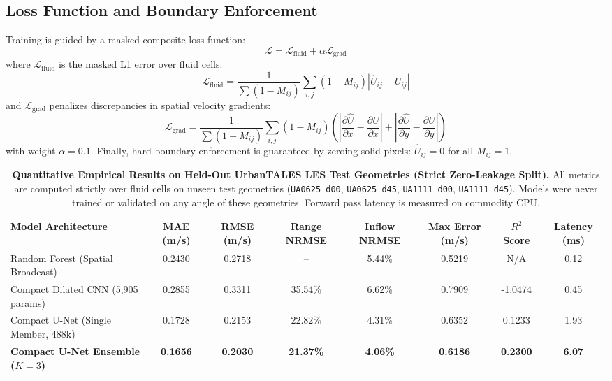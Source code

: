 \documentclass[10pt,twocolumn]{article}
\begin{document}
\subsection{Loss Function and Boundary Enforcement}
Training is guided by a masked composite loss function:
\begin{equation}
    \mathcal{L} = \mathcal{L}_{\text{fluid}} + \alpha \mathcal{L}_{\text{grad}}
\end{equation}
where $\mathcal{L}_{\text{fluid}}$ is the masked L1 error over fluid cells:
\begin{equation}
    \mathcal{L}_{\text{fluid}} = \frac{1}{\sum (1 - M_{ij})} \sum_{i,j} (1 - M_{ij}) |\widehat{U}_{ij} - U_{ij}|
\end{equation}
and $\mathcal{L}_{\text{grad}}$ penalizes discrepancies in spatial velocity gradients:
\begin{equation}
    \mathcal{L}_{\text{grad}} = \frac{1}{\sum (1 - M_{ij})} \sum_{i,j} (1 - M_{ij}) \left( \left|\frac{\partial \widehat{U}}{\partial x} - \frac{\partial U}{\partial x}\right| + \left|\frac{\partial \widehat{U}}{\partial y} - \frac{\partial U}{\partial y}\right| \right)
\end{equation}
with weight $\alpha = 0.1$. Finally, hard boundary enforcement is guaranteed by zeroing solid pixels: $\widehat{U}_{ij} = 0$ for all $M_{ij} = 1$.

\begin{table}[t]
\centering
\small
\caption{\textbf{Quantitative Empirical Results on Held-Out UrbanTALES LES Test Geometries (Strict Zero-Leakage Split).} All metrics are computed strictly over fluid cells on unseen test geometries (\texttt{UA0625\_d00}, \texttt{UA0625\_d45}, \texttt{UA1111\_d00}, \texttt{UA1111\_d45}). Models were never trained or validated on any angle of these geometries. Forward pass latency is measured on commodity CPU.}
\label{tab:results}
\begin{tabular}{lccccccc}
\toprule
\textbf{Model Architecture} & \textbf{MAE (m/s)} & \textbf{RMSE (m/s)} & \textbf{Range NRMSE} & \textbf{Inflow NRMSE} & \textbf{Max Error (m/s)} & \textbf{$R^2$ Score} & \textbf{Latency (ms)} \\
\midrule
Random Forest (Spatial Broadcast) & 0.2430 & 0.2718 & -- & 5.44\% & 0.5219 & N/A & 0.12 \\
Compact Dilated CNN (5,905 params) & 0.2855 & 0.3311 & 35.54\% & 6.62\% & 0.7909 & -1.0474 & 0.45 \\
Compact U-Net (Single Member, 488k) & 0.1728 & 0.2153 & 22.82\% & 4.31\% & 0.6352 & 0.1233 & 1.93 \\
\textbf{Compact U-Net Ensemble ($K=3$)} & \textbf{0.1656} & \textbf{0.2030} & \textbf{21.37\%} & \textbf{4.06\%} & \textbf{0.6186} & \textbf{0.2300} & \textbf{6.07} \\
\bottomrule
\end{tabular}
\end{table}
\end{document}
